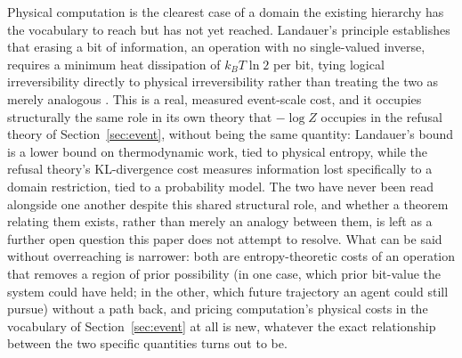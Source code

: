\documentclass[11pt]{article}
\theoremstyle{plain}
\begin{document}
Physical computation is the clearest case of a domain the existing hierarchy has the vocabulary to reach but has not yet reached. Landauer's principle establishes that erasing a bit of information, an operation with no single-valued inverse, requires a minimum heat dissipation of $k_B T \ln 2$ per bit, tying logical irreversibility directly to physical irreversibility rather than treating the two as merely analogous \citep{landauer1961}. This is a real, measured event-scale cost, and it occupies structurally the same role in its own theory that $-\log Z$ occupies in the refusal theory of Section~\ref{sec:event}, without being the same quantity: Landauer's bound is a lower bound on thermodynamic work, tied to physical entropy, while the refusal theory's KL-divergence cost measures information lost specifically to a domain restriction, tied to a probability model. The two have never been read alongside one another despite this shared structural role, and whether a theorem relating them exists, rather than merely an analogy between them, is left as a further open question this paper does not attempt to resolve. What can be said without overreaching is narrower: both are entropy-theoretic costs of an operation that removes a region of prior possibility (in one case, which prior bit-value the system could have held; in the other, which future trajectory an agent could still pursue) without a path back, and pricing computation's physical costs in the vocabulary of Section~\ref{sec:event} at all is new, whatever the exact relationship between the two specific quantities turns out to be.
\end{document}
